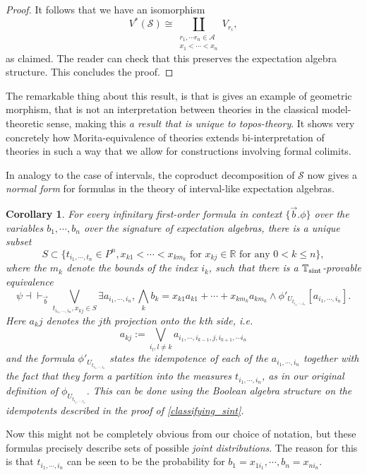 \documentclass[a4paper]{amsproc}
\theoremstyle{plain}
\newtheorem{corollary}[theorem]{Corollary}
\theoremstyle{definition}
\theoremstyle{remark}
\numberwithin{equation}{section}
\begin{document}
\begin{proof}
    It follows that we have an isomorphism \[V^*(\mathcal{S}) \cong \coprod_{\substack{r_1, \cdots r_n \in \mathcal{A} \\ x_1 < \cdots < x_n}} V_{r_i},\] as claimed. The reader can check that this preserves the expectation algebra structure. This concludes the proof.
\end{proof}

The remarkable thing about this result, is that is gives an example of geometric morphism, that is not an interpretation between theories in the classical model-theoretic sense, making this \emph{a result that is unique to topos-theory}. It shows very concretely how Morita-equivalence of theories extends bi-interpretation of theories in such a way that we allow for constructions involving formal colimits.

In analogy to the case of intervals, the coproduct decomposition of $\mathcal{S}$ now gives a \emph{normal form} for formulas in the theory of interval-like expectation algebras.

\begin{corollary}\label{simple_normal_form}
    For every infinitary first-order formula in context $\{\vec{b} . \phi \}$ over the variables $b_1,\cdots,b_n$ over the signature of expectation algebras, there is a unique subset \[S \subset \{ t_{i_1,\cdots,t_n} \in P^n, x_{k 1} < \cdots < x_{k m_k}\text{ for }x_{k j} \in \mathbb{R} \text{ for any } 0 < k \le n \},\] where the $m_k$ denote the bounds of the index $i_k$, such that there is a $\mathbb{T}_{\textup{sint}}$-provable equivalence
    \[
     \psi \dashv \vdash_{\vec{b}} \bigvee_{t_{i_1,\cdots,i_n}, x_{k j} \in S} \exists a_{i_1,\cdots,i_n}, \bigwedge_k b_k = x_{k 1} a_{k 1} + \cdots + x_{k m_k} a_{k m_k}\wedge \phi'_{U_{t_{i_1,\cdots, i_n}}}[a_{i_1,\cdots,i_n}] .
    \]
    Here $a_k j$ denotes the $j$th projection onto the $k$th side, i.e.
    \[
        a_{kj} := \bigvee_{i_l, l \ne k} a_{i_1,\cdots,i_{k-1},j,i_{k+1}, \cdots i_n}
    \]
    and the formula $\phi'_{U_{t_{i_1,\cdots, i_n}}}$ states the idempotence of each of the $a_{i_1,\cdots,i_n}$ together with the fact that they form a partition into the measures $t_{i_1,\cdots,i_n}$, as in our original definition of $\phi_{U_{t_{i_1,\cdots, i_n}}}$. This can be done using the Boolean algebra structure on the idempotents described in the proof of \ref{classifying_sint}.
\end{corollary}

Now this might not be completely obvious from our choice of notation, but these formulas precisely describe sets of possible \emph{joint distributions}. The reason for this is that $t_{i_1,\cdots,i_n}$ can be seen to be the probability for $b_1 = x_{1i_1},\cdots, b_n = x_{ni_n}$.
\end{document}
